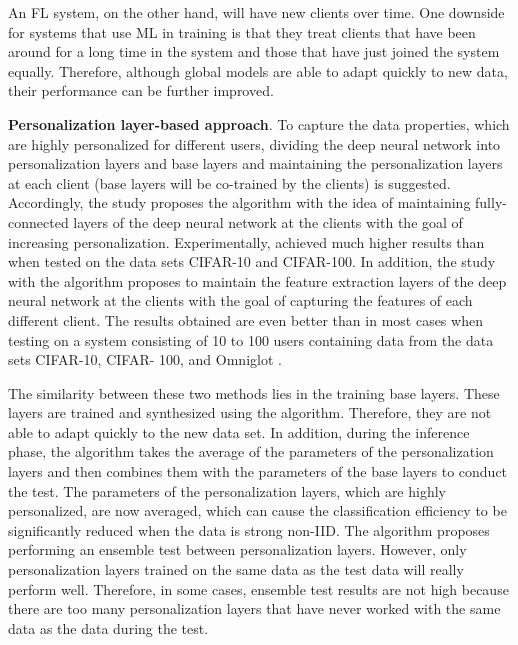 \documentclass[runningheads]{llncs}
\begin{document}
An FL system, on the other hand, will have new clients over time. One downside for systems that use ML in training is that they treat clients that have been around for a long time in the system and those that have just joined the system equally. Therefore, although global models are able to adapt quickly to new data, their performance can be further improved.

\textbf{Personalization layer-based approach}. To capture the data properties, which are highly personalized for different users, dividing the deep neural network into personalization layers and base layers and maintaining the personalization layers at each client (base layers will be co-trained by the clients) is suggested. Accordingly, the study \cite{arivazhagan2019federated} proposes the  algorithm with the idea of maintaining fully-connected layers of the deep neural network at the clients with the goal of increasing personalization. Experimentally,  achieved much higher results than  when tested on the data sets CIFAR-10 and CIFAR-100. In addition, the study \cite{liang2020think} with the algorithm  proposes to maintain the feature extraction layers of the deep neural network at the clients with the goal of capturing the features of each different client. The results obtained are even better than  in most cases when testing on a system consisting of 10 to 100 users containing data from the data sets CIFAR-10, CIFAR- 100, and Omniglot \cite{lake2015human}.

The similarity between these two methods lies in the training base layers. These layers are trained and synthesized using the  algorithm. Therefore, they are not able to adapt quickly to the new data set. In addition, during the inference phase, the  algorithm takes the average of the parameters of the personalization layers and then combines them with the parameters of the base layers to conduct the test. The parameters of the personalization layers, which are highly personalized, are now averaged, which can cause the classification efficiency to be significantly reduced when the data is strong non-IID. The algorithm  proposes performing an ensemble test between personalization layers. However, only personalization layers trained on the same data as the test data will really perform well. Therefore, in some cases, ensemble test results are not high because there are too many personalization layers that have never worked with the same data as the data during the test.
\end{document}
